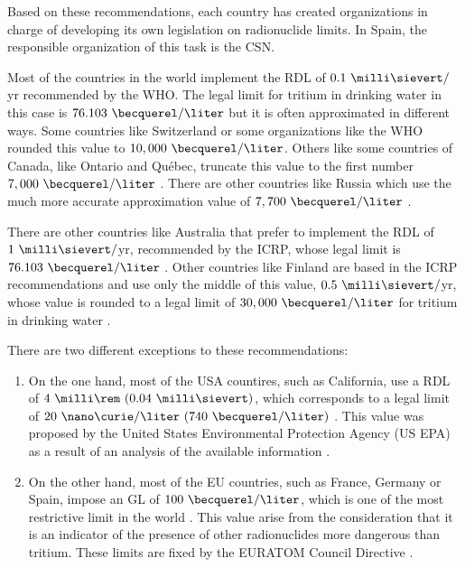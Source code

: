 Based on these recommendations, each country has created organizations in charge of developing its own legislation on radionuclide limits. In Spain, the responsible organization of this task is the CSN.

Most of the countries in the world implement the RDL of $0.1~\milli\sievert/$yr recommended by the WHO. The legal limit for tritium in drinking water in this case is $76.103~\becquerel/\liter$  but it is often approximated in different ways. Some countries like Switzerland \cite{Switzerland_GL} or some organizations like the WHO \cite{WHO_GL} rounded this value to $10,000~\becquerel/\liter$. Others like some countries of Canada, like Ontario and Québec, truncate this value to the first number $7,000~\becquerel/\liter$ \cite{Ontario_GL, Quebec_GL}. There are other countries like Russia which use the much more accurate approximation value of $7,700~\becquerel/\liter$ \cite{Russia_GL}.

There are other countries like Australia that prefer to implement the RDL of $1~\milli\sievert/$yr, recommended by the ICRP, whose legal limit is $76.103~\becquerel/\liter$ \cite{Australia_GL}. Other countries like Finland are based in the ICRP recommendations and use only the middle of this value, $0.5~\milli\sievert/$yr, whose value is rounded to a legal limit of $30,000~\becquerel/\liter$ for tritium in drinking water \cite{Finland_GL}.

There are two different exceptions to these recommendations:
\begin{enumerate}
\item{} On the one hand, most of the USA countires, such as California, use a RDL of $4~\milli\rem~(0.04~\milli\sievert)$, which corresponds to a legal limit of $20~\nano\curie/\liter~(740~\becquerel/\liter)$ \cite{California_GL}. This value was proposed by the United States Environmental Protection Agency (US EPA) as a result of an analysis of the available information \cite{USEPA_GL}.

\item{} On the other hand, most of the EU countries, such as France, Germany or Spain, impose an GL of $100~\becquerel/\liter$, which is one of the most restrictive limit in the world \cite{France_GL, Germany_GL, Spain_GL}. This value arise from the consideration that it is an indicator of the presence of other radionuclides more dangerous than tritium. These limits are fixed by the EURATOM Council Directive \cite{EURATOM_GL}. 
\end{enumerate}

